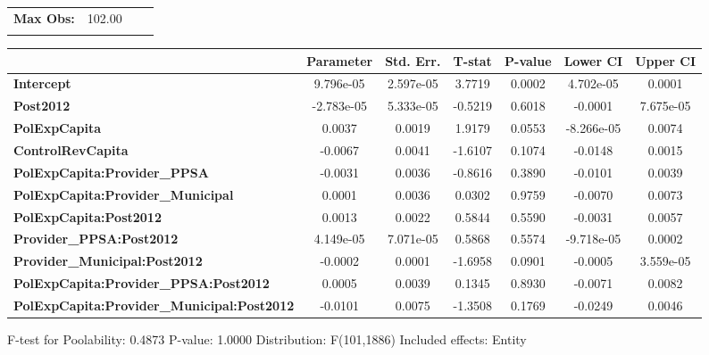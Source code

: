 \begin{center}
\begin{tabular}{lclc}
\textbf{Max Obs:}                                  &       102.00       & \textbf{                     }   &                  \\
\textbf{}                                          &                    & \textbf{                     }   &                  \\
\bottomrule
\end{tabular}
\begin{tabular}{lcccccc}
                                                   & \textbf{Parameter} & \textbf{Std. Err.} & \textbf{T-stat} & \textbf{P-value} & \textbf{Lower CI} & \textbf{Upper CI}  \\
\midrule
\textbf{Intercept}                                 &     9.796e-05      &     2.597e-05      &      3.7719     &      0.0002      &     4.702e-05     &       0.0001       \\
\textbf{Post2012}                                  &     -2.783e-05     &     5.333e-05      &     -0.5219     &      0.6018      &      -0.0001      &     7.675e-05      \\
\textbf{PolExpCapita}                              &       0.0037       &       0.0019       &      1.9179     &      0.0553      &     -8.266e-05    &       0.0074       \\
\textbf{ControlRevCapita}                          &      -0.0067       &       0.0041       &     -1.6107     &      0.1074      &      -0.0148      &       0.0015       \\
\textbf{PolExpCapita:Provider\_PPSA}               &      -0.0031       &       0.0036       &     -0.8616     &      0.3890      &      -0.0101      &       0.0039       \\
\textbf{PolExpCapita:Provider\_Municipal}          &       0.0001       &       0.0036       &      0.0302     &      0.9759      &      -0.0070      &       0.0073       \\
\textbf{PolExpCapita:Post2012}                     &       0.0013       &       0.0022       &      0.5844     &      0.5590      &      -0.0031      &       0.0057       \\
\textbf{Provider\_PPSA:Post2012}                   &     4.149e-05      &     7.071e-05      &      0.5868     &      0.5574      &     -9.718e-05    &       0.0002       \\
\textbf{Provider\_Municipal:Post2012}              &      -0.0002       &       0.0001       &     -1.6958     &      0.0901      &      -0.0005      &     3.559e-05      \\
\textbf{PolExpCapita:Provider\_PPSA:Post2012}      &       0.0005       &       0.0039       &      0.1345     &      0.8930      &      -0.0071      &       0.0082       \\
\textbf{PolExpCapita:Provider\_Municipal:Post2012} &      -0.0101       &       0.0075       &     -1.3508     &      0.1769      &      -0.0249      &       0.0046       \\
\bottomrule
\end{tabular}
\end{center}

F-test for Poolability: 0.4873 \newline
 P-value: 1.0000 \newline
 Distribution: F(101,1886) \newline
  \newline
 Included effects: Entity